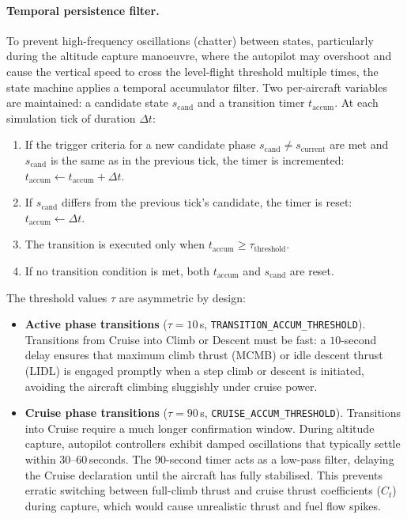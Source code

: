 \paragraph{Temporal persistence filter.}
To prevent high-frequency oscillations (chatter) between states, particularly during the altitude capture manoeuvre, where the autopilot may overshoot and cause the vertical speed to cross the level-flight threshold multiple times, the state machine applies a temporal accumulator filter. Two per-aircraft variables are maintained: a candidate state $s_{\text{cand}}$ and a transition timer $t_{\text{accum}}$. At each simulation tick of duration $\Delta t$:

\begin{enumerate}
    \item If the trigger criteria for a new candidate phase $s_{\text{cand}} \neq s_{\text{current}}$ are met and $s_{\text{cand}}$ is the same as in the previous tick, the timer is incremented: $t_{\text{accum}} \leftarrow t_{\text{accum}} + \Delta t$.
    \item If $s_{\text{cand}}$ differs from the previous tick's candidate, the timer is reset: $t_{\text{accum}} \leftarrow \Delta t$.
    \item The transition is executed only when $t_{\text{accum}} \geq \tau_{\text{threshold}}$.
    \item If no transition condition is met, both $t_{\text{accum}}$ and $s_{\text{cand}}$ are reset.
\end{enumerate}

The threshold values $\tau$ are asymmetric by design:

\begin{itemize}
    \item \textbf{Active phase transitions} ($\tau = 10$\,s, \texttt{TRANSITION\_ACCUM\_THRESHOLD}). Transitions from Cruise into Climb or Descent must be fast: a $10$-second delay ensures that maximum climb thrust (MCMB) or idle descent thrust (LIDL) is engaged promptly when a step climb or descent is initiated, avoiding the aircraft climbing sluggishly under cruise power.

    \item \textbf{Cruise phase transitions} ($\tau = 90$\,s, \texttt{CRUISE\_ACCUM\_THRESHOLD}). Transitions into Cruise require a much longer confirmation window. During altitude capture, autopilot controllers exhibit damped oscillations that typically settle within 30--60\,seconds. The $90$-second timer acts as a low-pass filter, delaying the Cruise declaration until the aircraft has fully stabilised. This prevents erratic switching between full-climb thrust and cruise thrust coefficients ($C_t$) during capture, which would cause unrealistic thrust and fuel flow spikes.
\end{itemize}

